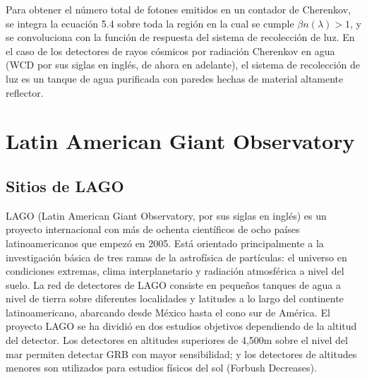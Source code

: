\documentclass{book}
\begin{document}
Para obtener el n\'umero total de fotones emitidos en un contador de Cherenkov, se integra la ecuaci\'on 5.4 sobre toda la regi\'on en la cual se cumple $\beta n(\lambda) > 1$, y se convoluciona con la funci\'on de respuesta del sistema de recolecci\'on de luz. En el caso de los detectores de rayos c\'osmicos por radiaci\'on Cherenkov en agua (WCD por sus siglas en ingl\'es, de ahora en adelante), el sistema de recolecci\'on de luz es un tanque de agua purificada con paredes hechas de material altamente reflector.

\section{Latin American Giant Observatory}
\subsection{Sitios de LAGO}
LAGO (Latin American Giant Observatory, por sus siglas en ingl\'es) es un proyecto internacional con m\'as de ochenta cient\'ificos de ocho pa\'ises latinoamericanos que empez\'o en 2005. Est\'a orientado principalmente a la investigaci\'on b\'asica de tres ramas de la astrof\'isica de part\'iculas: el universo en condiciones extremas, clima interplanetario y radiaci\'on atmosf\'erica a nivel del suelo. La red de detectores de LAGO consiste en peque\~nos tanques de agua a nivel de tierra sobre diferentes localidades y latitudes a lo largo del continente latinoamericano, abarcando desde M\'exico hasta el cono sur de Am\'erica. El proyecto LAGO se ha dividi\'o en dos estudios objetivos dependiendo de la altitud del detector. Los detectores en altitudes superiores de 4,500m sobre el nivel del mar permiten detectar GRB con mayor sensibilidad; y los detectores de altitudes menores son utilizados para estudios f\'isicos del sol (Forbush Decreases). \citep{ASOREY2015}
\end{document}
